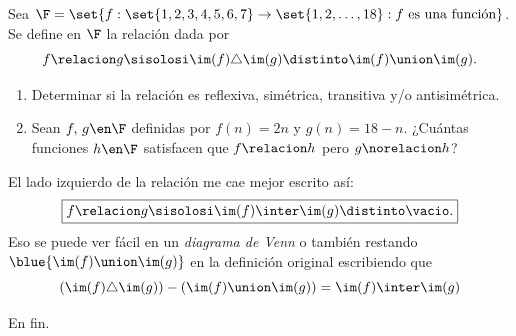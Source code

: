 \begin{enunciado}{\ejExtra[recu 25/11/25]}

  Sea $\F = \set{f: \set{1,2,3,4,5,6,7} \to \set{1,2,\ldots,18}: f ~ \text{es una función} }$. Se define en $\F$ la relación dada por
  $$
    f \relacion g \sisolosi \im(f) \triangle \im(g) \distinto \im(f) \union \im(g).
  $$
  \begin{enumerate}[label=\alph*)]
    \item Determinar si la relación es reflexiva, simétrica, transitiva y/o antisimétrica.
    \item Sean $f,\, g \en \F$ definidas por $f(n) = 2n$ y $g(n) = 18 - n$. ¿Cuántas funciones $h \en \F$ satisfacen
          que $f\relacion h$ pero $g \norelacion h$?
  \end{enumerate}
\end{enunciado}

El lado izquierdo de la relación me cae mejor escrito así:
$$
  \boxed{
    f \relacion g \sisolosi \im(f) \inter \im(g) \distinto \vacio.
  }
$$
Eso se puede ver fácil en un \textit{diagrama de Venn} o también restando $\blue{ \im(f) \union \im(g) }$ en la definición original escribiendo
que
$$
  (\im(f) \triangle \im(g))
  -
  (\im(f) \union \im(g))
  =
  \im(f) \inter \im(g)
$$

En fin.

\bigskip

